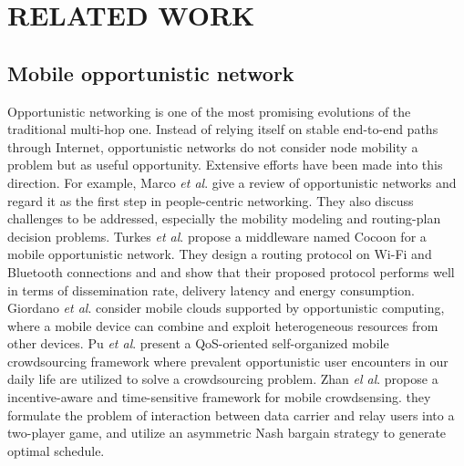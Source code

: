 \documentclass[journal]{IEEEtran}
\begin{document}
\section{RELATED WORK}

\subsection{Mobile opportunistic network}
Opportunistic networking is one of the most promising evolutions of the traditional multi-hop one. 
Instead of relying itself on stable end-to-end paths through Internet, opportunistic networks do not consider node mobility a problem but as useful opportunity. 
Extensive efforts have been made into this direction. For example, Marco \emph{et al}. \cite{Conti2014} give a review of opportunistic networks and regard it as the first step in people-centric networking. They also discuss challenges to be addressed, especially the mobility modeling and routing-plan decision problems.
Turkes \emph{et al}. \cite{turkes2016cocoon} propose a middleware named Cocoon for a mobile opportunistic network. They design a routing protocol on Wi-Fi and Bluetooth connections and and show that their proposed protocol performs well in terms of dissemination rate, delivery latency and energy consumption.
Giordano \emph{et al}. \cite{giordano2011human} consider mobile clouds supported by opportunistic computing, where a mobile device can combine and exploit heterogeneous resources from other devices.
Pu \emph{et al}. \cite{Pu2017crowd} present a QoS-oriented self-organized mobile crowdsourcing framework where prevalent opportunistic user encounters in our daily life are utilized to solve a crowdsourcing problem.
Zhan \emph{el al}. \cite{zhan2017time} propose a incentive-aware and time-sensitive framework for mobile crowdsensing. they formulate the problem of interaction between data carrier and relay users into a two-player game, and utilize an asymmetric Nash bargain strategy to generate optimal schedule.
\end{document}
